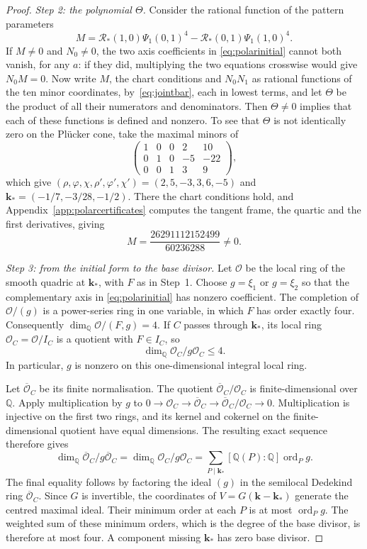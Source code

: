 \documentclass[11pt]{article}
\theoremstyle{definition}
\theoremstyle{remark}
\begin{document}
\begin{proof}
\emph{Step 2: the polynomial $\Theta$.} Consider the rational function of the
pattern parameters
\[
 M=\mathcal R_*(1,0)\Psi_1(0,1)^4-\mathcal R_*(0,1)\Psi_1(1,0)^4.
\]
If $M\ne0$ and $N_0\ne0$, the two axis coefficients in
\eqref{eq:polarinitial} cannot both vanish, for any $a$: if they did,
multiplying the two equations crosswise would give $N_0M=0$. Now write $M$, the
chart conditions and $N_0N_1$ as rational functions of the ten minor
coordinates, by~\eqref{eq:jointbar}, each in lowest terms, and let $\Theta$ be
the product of all their numerators and denominators. Then $\Theta\ne0$ implies
that each of these functions is defined and nonzero. To see that
$\Theta$ is not identically zero on the Pl\"ucker cone, take the maximal
minors of
\[
 \begin{pmatrix}1&0&0&2&10\\0&1&0&-5&-22\\0&0&1&3&9\end{pmatrix},
\]
which give $(\rho,\varphi,\chi,\rho',\varphi',\chi')=(2,5,-3,3,6,-5)$ and
$\mathbf k_*=(-1/7,-3/28,-1/2)$. There the chart conditions hold, and
Appendix~\ref{app:polarcertificates} computes the tangent frame, the quartic and
the first derivatives, giving
\[
 M=\frac{26291112152499}{60236288}\ne0.
\]

\emph{Step 3: from the initial form to the base divisor.}
Let $\mathcal O$ be the local ring of the smooth quadric at $\mathbf k_*$, with $F$ as in
Step~1. Choose $g=\xi_1$ or $g=\xi_2$ so that the complementary axis in
\eqref{eq:polarinitial} has nonzero coefficient. The completion of
$\mathcal O/(g)$ is a power-series ring in one variable, in which $F$ has order
exactly four. Consequently
$\dim_{\mathbb Q}\mathcal O/(F,g)=4$.
If $C$ passes through $\mathbf k_*$, its local ring $\mathcal O_C=\mathcal O/I_C$ is a
quotient with $F\in I_C$, so
\[
 \dim_{\mathbb Q}\mathcal O_C/g\mathcal O_C\le4.
\]
In particular, $g$ is nonzero on this one-dimensional integral local ring.

Let $\overline{\mathcal O}_C$ be its finite normalisation. The quotient
$\overline{\mathcal O}_C/\mathcal O_C$ is finite-dimensional over $\mathbb Q$.
Apply multiplication by $g$ to
$0\to\mathcal O_C\to\overline{\mathcal O}_C\to\overline{\mathcal O}_C/\mathcal O_C\to0$.
Multiplication is injective on the first two rings, and its kernel and cokernel
on the finite-dimensional quotient have equal dimensions. The resulting exact
sequence therefore gives
\[
 \dim_{\mathbb Q}\overline{\mathcal O}_C/g\overline{\mathcal O}_C
 =\dim_{\mathbb Q}\mathcal O_C/g\mathcal O_C
 =\sum_{P\mid\mathbf k_*}[\mathbb Q(P):\mathbb Q]\operatorname{ord}_P g.
\]
The final equality follows by factoring the ideal $(g)$ in the semilocal
Dedekind ring $\overline{\mathcal O}_C$. Since $G$ is invertible, the coordinates of
$V=G(\mathbf k-\mathbf k_*)$ generate the centred maximal ideal. Their minimum order
at each $P$ is at most $\operatorname{ord}_P g$. The weighted sum of these
minimum orders, which is the degree of the base divisor, is therefore at most
four. A component missing $\mathbf k_*$ has zero base divisor.
\end{proof}
\end{document}
